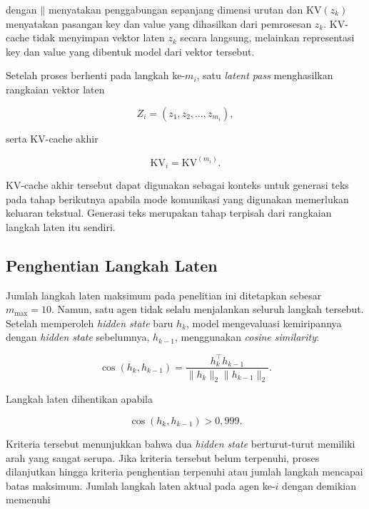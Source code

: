 dengan $\mathbin{\|}$ menyatakan penggabungan sepanjang dimensi urutan dan
$\mathrm{KV}(z_k)$ menyatakan pasangan key dan value yang dihasilkan dari
pemrosesan $z_k$. KV-cache tidak menyimpan vektor laten
$z_k$ secara langsung, melainkan representasi key dan value yang dibentuk
model dari vektor tersebut.

Setelah proses berhenti pada langkah ke-$m_i$, satu \textit{latent pass}
menghasilkan rangkaian vektor laten

\begin{equation}
Z_i=(z_1,z_2,\ldots,z_{m_i}),
\label{eq:latent-sequence}
\end{equation}

serta KV-cache akhir

\begin{equation}
\mathrm{KV}_i=\mathrm{KV}^{(m_i)}.
\label{eq:latent-final-kv}
\end{equation}

KV-cache akhir tersebut dapat digunakan sebagai konteks untuk generasi
teks pada tahap berikutnya apabila mode komunikasi yang digunakan
memerlukan keluaran tekstual. Generasi teks merupakan tahap terpisah dari
rangkaian langkah laten itu sendiri.

\subsection{Penghentian Langkah Laten}
\label{subsec:latent-early-stopping}

Jumlah langkah laten maksimum pada penelitian ini ditetapkan sebesar
$m_{\max}=10$. Namun, satu agen tidak selalu menjalankan seluruh langkah
tersebut. Setelah memperoleh \textit{hidden state} baru $h_k$, model
mengevaluasi kemiripannya dengan \textit{hidden state} sebelumnya,
$h_{k-1}$, menggunakan \textit{cosine similarity}:

\begin{equation}
\operatorname{cos}(h_k,h_{k-1})
=
\frac{h_k^\top h_{k-1}}
{\|h_k\|_2\|h_{k-1}\|_2}.
\label{eq:latent-cosine}
\end{equation}

Langkah laten dihentikan apabila

\begin{equation}
\operatorname{cos}(h_k,h_{k-1})>0{,}999.
\label{eq:latent-stopping-criterion}
\end{equation}

Kriteria tersebut menunjukkan bahwa dua \textit{hidden state} berturut-turut
memiliki arah yang sangat serupa. Jika kriteria tersebut belum terpenuhi,
proses dilanjutkan hingga kriteria penghentian terpenuhi atau jumlah langkah
mencapai batas maksimum. Jumlah langkah laten aktual pada agen ke-$i$
dengan demikian memenuhi

